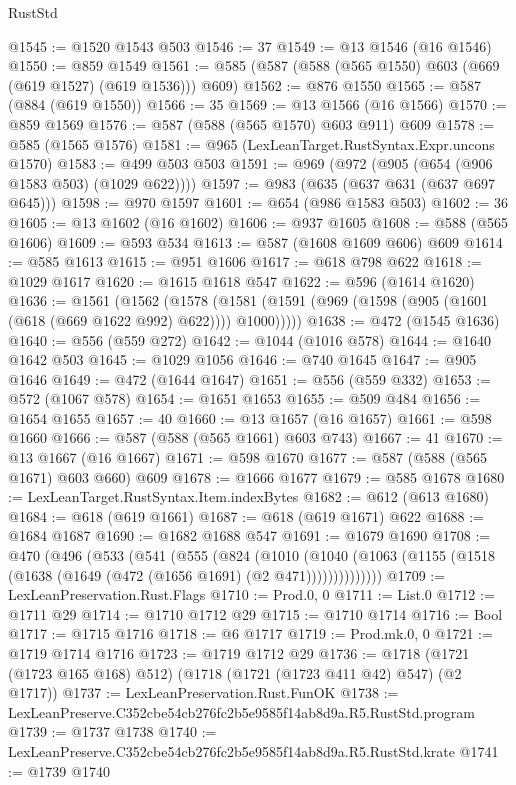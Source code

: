 \begin{lexlean}{RustStd}
\begin{coremodule}
@1545 := @1520 @1543 @503
@1546 := 37
@1549 := @13 @1546 (@16 @1546)
@1550 := @859 @1549
@1561 := @585 (@587 (@588 (@565 @1550) @603 (@669 (@619 @1527) (@619 @1536))) @609)
@1562 := @876 @1550
@1565 := @587 (@884 (@619 @1550))
@1566 := 35
@1569 := @13 @1566 (@16 @1566)
@1570 := @859 @1569
@1576 := @587 (@588 (@565 @1570) @603 @911) @609
@1578 := @585 (@1565 @1576)
@1581 := @965 (LexLeanTarget.RustSyntax.Expr.uncons @1570)
@1583 := @499 @503 @503
@1591 := @969 (@972 (@905 (@654 (@906 @1583 @503) (@1029 @622))))
@1597 := @983 (@635 (@637 @631 (@637 @697 @645)))
@1598 := @970 @1597
@1601 := @654 (@986 @1583 @503)
@1602 := 36
@1605 := @13 @1602 (@16 @1602)
@1606 := @937 @1605
@1608 := @588 (@565 @1606)
@1609 := @593 @534
@1613 := @587 (@1608 @1609 @606) @609
@1614 := @585 @1613
@1615 := @951 @1606
@1617 := @618 @798 @622
@1618 := @1029 @1617
@1620 := @1615 @1618 @547
@1622 := @596 (@1614 @1620)
@1636 := @1561
    (@1562
      (@1578 (@1581 (@1591 (@969 (@1598 (@905 (@1601 (@618 (@669 @1622 @992) @622)))) @1000)))))
@1638 := @472 (@1545 @1636)
@1640 := @556 (@559 @272)
@1642 := @1044 (@1016 @578)
@1644 := @1640 @1642 @503
@1645 := @1029 @1056
@1646 := @740 @1645
@1647 := @905 @1646
@1649 := @472 (@1644 @1647)
@1651 := @556 (@559 @332)
@1653 := @572 (@1067 @578)
@1654 := @1651 @1653
@1655 := @509 @484
@1656 := @1654 @1655
@1657 := 40
@1660 := @13 @1657 (@16 @1657)
@1661 := @598 @1660
@1666 := @587 (@588 (@565 @1661) @603 @743)
@1667 := 41
@1670 := @13 @1667 (@16 @1667)
@1671 := @598 @1670
@1677 := @587 (@588 (@565 @1671) @603 @660) @609
@1678 := @1666 @1677
@1679 := @585 @1678
@1680 := LexLeanTarget.RustSyntax.Item.indexBytes
@1682 := @612 (@613 @1680)
@1684 := @618 (@619 @1661)
@1687 := @618 (@619 @1671) @622
@1688 := @1684 @1687
@1690 := @1682 @1688 @547
@1691 := @1679 @1690
@1708 := @470
    (@496
      (@533
        (@541
          (@555
            (@824
              (@1010
                (@1040 (@1063 (@1155 (@1518 (@1638 (@1649 (@472 (@1656 @1691) (@2 @471))))))))))))))
@1709 := LexLeanPreservation.Rust.Flags
@1710 := Prod.{0, 0}
@1711 := List.{0}
@1712 := @1711 @29
@1714 := @1710 @1712 @29
@1715 := @1710 @1714
@1716 := Bool
@1717 := @1715 @1716
@1718 := @6 @1717
@1719 := Prod.mk.{0, 0}
@1721 := @1719 @1714 @1716
@1723 := @1719 @1712 @29
@1736 := @1718 (@1721 (@1723 @165 @168) @512) (@1718 (@1721 (@1723 @411 @42) @547) (@2 @1717))
@1737 := LexLeanPreservation.Rust.FunOK
@1738 := LexLeanPreserve.C352cbe54cb276fc2b5e9585f14ab8d9a.R5.RustStd.program
@1739 := @1737 @1738
@1740 := LexLeanPreserve.C352cbe54cb276fc2b5e9585f14ab8d9a.R5.RustStd.krate
@1741 := @1739 @1740

\end{coremodule}
\end{lexlean}

